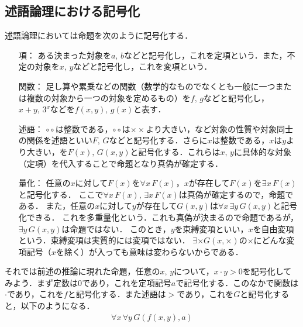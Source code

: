 \documentclass[10pt,b5paper,papersize,dvipdfmx]{jsbook}
\newcommand\fal[1]{\forall#1\,}
\newcommand\ext[1]{\exists#1\,}
\begin{document}
\subsection{述語論理における記号化}
述語論理においては命題を次のように記号化する． 
\begin{itemize}
  \item[項：]
  ある決まった対象を$a,\,b$などと記号化し，これを定項という．また，不定の対象を$x,\,y$などと記号化し，これを変項という． 
  \item[関数：]
  足し算や累乗などの関数（数学的なものでなくとも一般に一つまたは複数の対象から一つの対象を定めるもの）を$f,\,g$などと記号化し，$x+y,\,3^x$などを$f(x,y),\,g(x)$と表す．
  \item[述語：]
  $\circ\circ$は整数である，$\circ\circ$は$\times\times$より大きい，など対象の性質や対象同士の関係を述語といい$F,\,G$などと記号化する．さらに$x$は整数である，$x$は$y$より大きい，を$F(x),\,G(x,y)$と記号化する．これらは$x,\,y$に具体的な対象（定項）を代入することで命題となり真偽が確定する．
  \item[量化：]
  任意の$x$に対して$F(x)$を$\fal{x} F(x)$，$x$が存在して$F(x)$を$\ext{x} F(x)$と記号化する．
  ここで$\fal{x} F(x),\,\ext{x} F(x)$は真偽が確定するので，命題である．
  また，任意の$x$に対して$y$が存在して$G(x,y)$は$\fal{x} \ext{y} G(x,y)$と記号化できる．
  これを多重量化という．これも真偽が決まるので命題であるが，$\ext{y} G(x,y)$は命題ではない．
  このとき，$y$を束縛変項といい，$x$を自由変項という．束縛変項は実質的には変項ではない．
  $\exists \times G(x,\times)$の$\times$にどんな変項記号（$x$を除く）が入っても意味は変わらないからである．
\end{itemize}
それでは前述の推論に現れた命題，任意の$x,\,y$について，$x\cdot y>0$を記号化してみよう．まず定数は$0$であり，これを定項記号$a$で記号化する．このなかで関数は$\cdot$であり，これを$f$と記号化する．また述語は$>$であり，これを$G$と記号化すると，以下のようになる．
\begin{align*}
  \fal{x} \fal{y} G(f(x,y),a)
\end{align*}
\end{document}
